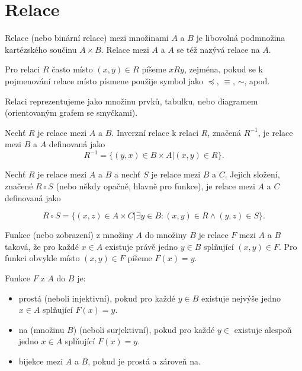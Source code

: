 \documentclass[12pt]{article}					%
\begin{document}
\section{Relace}
    \begin{definice}[Relace]
        Relace (nebo binární relace) mezi množinami $A$ a $B$ je libovolná podmnožina kartézského součinu $A \times B$. Relace mezi $A$ a $A$ se též nazývá relace na $A$.

        Pro relaci $R$ často místo $(x, y) \in R$ píšeme $xRy$, zejména, pokud se k pojmenování relace místo písmene použije symbol jako $\preceq$, $≡$, $\sim$, apod.

        Relaci reprezentujeme jako množinu prvků, tabulku, nebo diagramem (orientovaným grafem se smyčkami).
    \end{definice}

    \begin{definice}
        Nechť $R$ je relace mezi $A$ a $B$. Inverzní relace k relaci $R$, značená $R^{-1}$, je relace mezi $B$ a $A$ definovaná jako
        $$ R^{-1} = \{(y, x) \in B \times A | (x, y) \in R\}. $$ 

        Nechť $R$ je relace mezi $A$ a $B$ a nechť $S$ je relace mezi $B$ a $C$. Jejich složení, značené $R\circ S$ (nebo někdy opačně, hlavně pro funkce), je relace mezi $A$ a $C$ definovaná jako

        $$ R\circ S = \{(x, z) \in A \times C | \exists y \in B: (x, y) \in R \land (y, z) \in S\}. $$ 

    \end{definice}

    \begin{definice}
        Funkce (nebo zobrazení) z množiny $A$ do množiny $B$ je relace $F$ mezi $A$ a $B$ taková, že pro každé $x \in A$ existuje právě jedno $y \in B$ splňující $(x, y) \in F$. Pro funkci obvykle místo $(x, y) \in F$ píšeme $F(x) = y$.
    \end{definice}

    \begin{definice}
        Funkce $F$ z $A$ do $B$ je:
        \begin{itemize}
            \item prostá (neboli injektivní), pokud pro každé $y \in B$ existuje nejvýše jedno $x \in A$ splňující $F(x) = y$.
            \item na (množinu $B$) (neboli surjektivní), pokud pro každé $y\in $ existuje alespoň jedno $x \in A$ splňující $F(x) = y$.
            \item bijekce mezi $A$ a $B$, pokud je prostá a zároveň na.
        \end{itemize}
    \end{definice}
\end{document}
